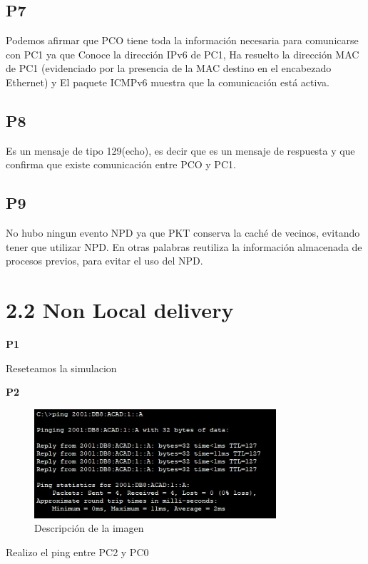 \documentclass{article}
\begin{document}
\subsection*{P7}
Podemos afirmar que PCO tiene toda la información necesaria para
comunicarse con PC1 ya que Conoce la dirección IPv6 de PC1, Ha resuelto la
dirección MAC de PC1 (evidenciado por la presencia de la MAC destino en el
encabezado Ethernet) y El paquete ICMPv6 muestra que la comunicación está
activa.

\subsection*{P8}
Es un mensaje de tipo 129(echo), es decir que es un mensaje de respuesta y
que confirma que existe comunicación entre PCO y PC1.

\subsection*{P9}
No hubo ningun evento NPD ya que PKT conserva la caché de vecinos,
evitando tener que utilizar NPD. En otras palabras reutiliza la información
almacenada de procesos previos, para evitar el uso del NPD.

\section*{2.2 Non Local delivery}
\textbf{P1}

Reseteamos la simulacion\\


\vspace{2cm}

\textbf{P2}
\begin{figure}[h]
    \centering
    \includegraphics[width=0.8\textwidth]{imagen4.PNG}
    \caption{Descripción de la imagen}
    \label{fig:ejemplo}
\end{figure}



Realizo el ping entre PC2 y PC0
\end{document}
